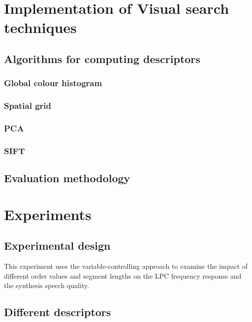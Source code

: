 \documentclass{article}
\begin{document}
\section{Implementation of Visual search techniques}

\subsection{Algorithms for computing descriptors}



\subsubsection{Global colour histogram}



\subsubsection{Spatial grid}



\subsubsection{PCA}



\subsubsection{SIFT}



\subsection{Evaluation methodology}




\section{Experiments}

\subsection{Experimental design}

This experiment uses the variable-controlling approach to examine the impact of different order values and segment lengths on the LPC frequency response and the synthesis speech quality.


\subsection{Different descriptors}
\end{document}
